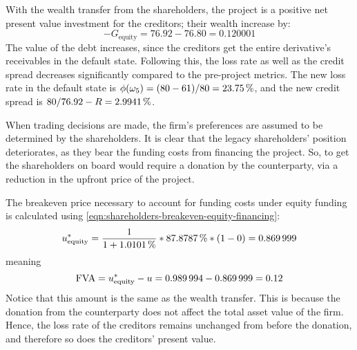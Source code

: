 \documentclass[main.tex]{subfiles}
\begin{document}
        With the wealth transfer from the shareholders,
        the project is a positive net present value investment for the creditors;
        their wealth increase by:
        \begin{equation*}\label{eqn:wealth-transfer-equality}
            -G_{\text{equity}} = \num{76.92} - \num{76.80} = \num{0.120001}
        \end{equation*}
        The value of the debt increases, 
        since the creditors get the entire derivative's receivables in the default state. 
        Following this, the loss rate as well as the credit spread decreases significantly 
        compared to the pre-project metrics. 
        The new loss rate in the default state is 
        $\phi(\omega_{5}) = (\num{80}-\num{61})/\num{80} = \pct{0.2375}$, 
        and the new credit spread is $\num{80}/\num{76.92} - \grossrfrate = \pct{0.029941}$.

        When trading decisions are made, the firm's preferences are assumed to be determined by the shareholders.
        It is clear that the legacy shareholders' position deteriorates, 
        as they bear the funding costs from financing the project.
        So, to get the shareholders on board would require a donation by the counterparty, 
        via a reduction in the upfront price of the project.

        The breakeven price necessary to account for funding costs under equity funding is calculated using
        \cref{eqn:shareholders-breakeven-equity-financing}:
            \begin{equation*}
                    u^{\ast}_{\text{equity}} 
                =
                    \frac{1}{1 + \pct{0.010101}} 
                    *
                    \pct{0.878787}
                    *
                    \left(
                        \num{1}
                        -
                        \num{0}
                    \right)
                =
                    \num{0.869999}
            \end{equation*}
        meaning 
        \begin{equation*}
            \FVA/ = u^{\ast}_{\text{equity}} - u =
            \num{0.989994}-\num{0.869999} =
            \num{0.12}
        \end{equation*}
        Notice that this amount is the same as the wealth transfer.
        This is because the donation from the counterparty does not affect the total asset value of the firm.
        Hence, the loss rate of the creditors remains unchanged from before the donation, and therefore so does the creditors' present value.
\end{document}
